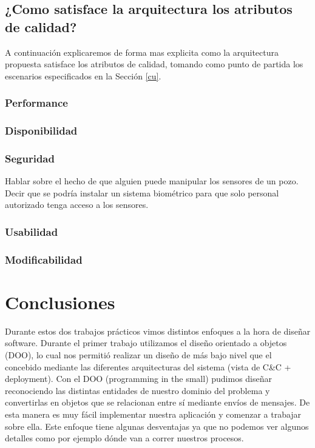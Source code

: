 \documentclass{article}
\theoremstyle{definition}
\theoremstyle{remark}
\begin{document}
\pagebreak

\subsection{¿Como satisface la arquitectura los atributos de calidad?}

A continuación explicaremos de forma mas explicita como la arquitectura propuesta satisface los atributos de calidad, tomando como punto de partida los escenarios especificados en la Sección \ref{cu}.

\subsubsection{Performance}
\subsubsection{Disponibilidad}
\subsubsection{Seguridad}
Hablar sobre el hecho de que alguien puede manipular los sensores de un pozo. Decir que se podría instalar un sistema biométrico para que solo personal autorizado tenga acceso a los sensores.

\subsubsection{Usabilidad}
\subsubsection{Modificabilidad}

\pagebreak

\section{Conclusiones}

Durante estos dos trabajos prácticos vimos distintos enfoques a la hora de diseñar software. Durante el primer trabajo utilizamos el diseño orientado a objetos (DOO), lo cual nos permitió realizar un diseño de más bajo nivel que el concebido mediante las diferentes arquitecturas del sistema (vista de C\&C + deployment). Con el DOO (programming in the small) pudimos diseñar reconociendo las distintas entidades de nuestro dominio del problema y convertirlas en objetos que se relacionan entre sí mediante envíos de mensajes. De esta manera es muy fácil implementar nuestra aplicación y comenzar a trabajar sobre ella. Este enfoque tiene algunas desventajas ya que no podemos ver algunos detalles como por ejemplo dónde van a correr nuestros procesos.
\end{document}
